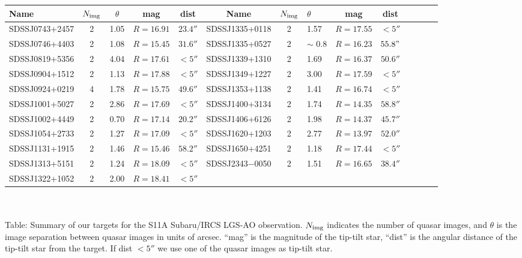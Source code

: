 \begin{technicalinfo}
\begin{tabular}{lcccccclcccccc}
   \hline\hline
Name & $N_{\rm img}$ & $\theta$ & mag & dist & Name & $N_{\rm img}$ & $\theta$ & mag & dist  \\
     \hline
SDSSJ0743+2457 & 2 & 1.05 & $R=16.91$ & $23.4''$ & SDSSJ1335+0118 & 2 & 1.57 & $R=17.55$ & $<5''$\\
SDSSJ0746+4403 & 2 & 1.08 & $R=15.45$ & $31.6''$ & SDSSJ1335+0527 & 2 & $\sim$ 0.8 & $R=16.23$ & $55.8"$\\
SDSSJ0819+5356 & 2 & 4.04 & $R=17.61$ & $<5''$ & SDSSJ1339+1310 & 2 & 1.69 & $R=16.37$ & $50.6''$\\
SDSSJ0904+1512 & 2 & 1.13 & $R=17.88$ & $<5''$ & SDSSJ1349+1227 & 2 & 3.00 & $R=17.59$ & $<5''$\\
SDSSJ0924+0219 & 4 & 1.78 & $R=15.75$ & $49.6''$ & SDSSJ1353+1138 & 2 & 1.41 & $R=16.74$ & $<5''$\\ 
SDSSJ1001+5027 & 2 & 2.86 & $R=17.69$ & $<5''$ & SDSSJ1400+3134 & 2 & 1.74 & $R=14.35$ & $58.8''$ \\
SDSSJ1002+4449 & 2 & 0.70 & $R=17.14$ & $20.2''$ & SDSSJ1406+6126 & 2 & 1.98 & $R=14.37$ & $45.7''$ \\ 
SDSSJ1054+2733 & 2 & 1.27 & $R=17.09$ & $<5''$ & SDSSJ1620+1203 & 2 & 2.77 & $R=13.97$ & $52.0''$\\
SDSSJ1131+1915 & 2 & 1.46 & $R=15.46$ & $58.2''$ & SDSSJ1650+4251 & 2 & 1.18 & $R=17.44$ & $<5''$\\
SDSSJ1313+5151 & 2 & 1.24 & $R=18.09$ & $<5''$ & SDSSJ2343$-$0050 & 2 & 1.51 & $R=16.65$ & $38.4''$\\
SDSSJ1322+1052 & 2 & 2.00 & $R=18.41$ & $<5''$ & & & & & &\\
   \hline
\end{tabular}
 \\
 \\
Table: Summary of our targets for the S11A Subaru/IRCS LGS-AO
observation. $N_{\rm img}$ indicates the number of quasar images, and
$\theta$ is the image separation between quasar images in units of
arcsec. ``mag'' is the magnitude of the tip-tilt star, ``dist''
is the angular distance of the tip-tilt star from the target. If dist
$<5''$ we use one of the quasar images as tip-tilt star.







\end{technicalinfo}
